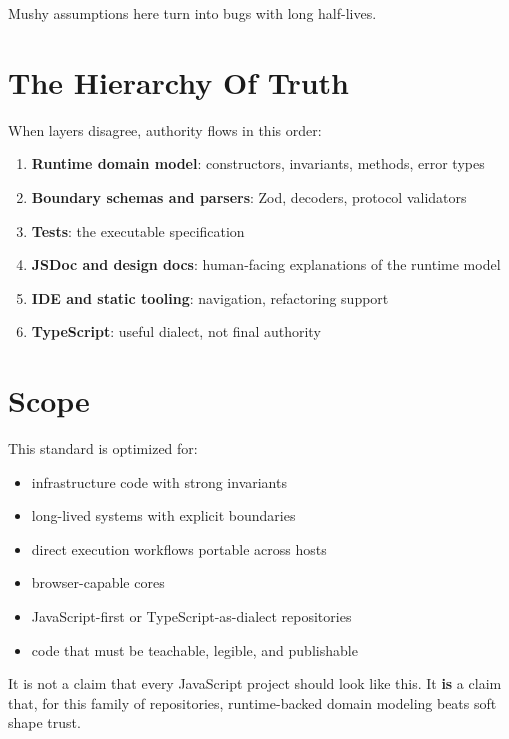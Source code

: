 Mushy assumptions here turn into bugs with long half-lives.

\section{The Hierarchy Of Truth}\label{record-060-the-hierarchy-of-truth}

When layers disagree, authority flows in this order:

\begin{enumerate}
\def\labelenumi{\arabic{enumi}.}
\tightlist
\item
  \textbf{Runtime domain model}: constructors, invariants, methods, error types
\item
  \textbf{Boundary schemas and parsers}: Zod, decoders, protocol validators
\item
  \textbf{Tests}: the executable specification
\item
  \textbf{JSDoc and design docs}: human-facing explanations of the runtime model
\item
  \textbf{IDE and static tooling}: navigation, refactoring support
\item
  \textbf{TypeScript}: useful dialect, not final authority
\end{enumerate}

\section{Scope}\label{record-060-scope}

This standard is optimized for:

\begin{itemize}
\tightlist
\item
  infrastructure code with strong invariants
\item
  long-lived systems with explicit boundaries
\item
  direct execution workflows portable across hosts
\item
  browser-capable cores
\item
  JavaScript-first or TypeScript-as-dialect repositories
\item
  code that must be teachable, legible, and publishable
\end{itemize}

It is not a claim that every JavaScript project should look like this. It \textbf{is} a claim that, for this family of repositories, runtime-backed domain modeling beats soft shape trust.

